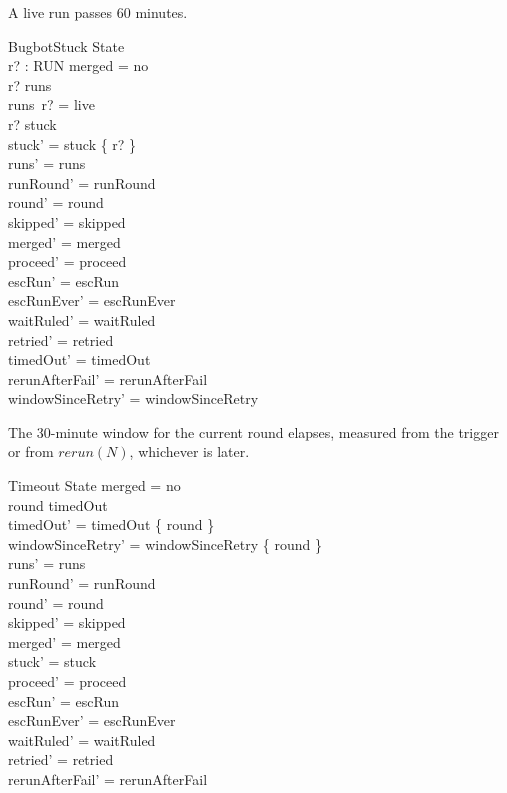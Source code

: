 \documentclass{article}
\begin{document}
A live run passes 60 minutes.

\begin{schema}{BugbotStuck}
  \Delta State \\
  r? : RUN
\where
  merged = no \\
  r? \in \dom runs \\
  runs~r? = live \\
  r? \notin stuck \\
  stuck' = stuck \cup \{ r? \} \\
  runs' = runs \\
  runRound' = runRound \\
  round' = round \\
  skipped' = skipped \\
  merged' = merged \\
  proceed' = proceed \\
  escRun' = escRun \\
  escRunEver' = escRunEver \\
  waitRuled' = waitRuled \\
  retried' = retried \\
  timedOut' = timedOut \\
  rerunAfterFail' = rerunAfterFail \\
  windowSinceRetry' = windowSinceRetry
\end{schema}

The 30-minute window for the current round elapses, measured from the trigger
or from $rerun(N)$, whichever is later.

\begin{schema}{Timeout}
  \Delta State
\where
  merged = no \\
  round \notin timedOut \\
  timedOut' = timedOut \cup \{ round \} \\
  windowSinceRetry' = windowSinceRetry \cup \{ round \} \\
  runs' = runs \\
  runRound' = runRound \\
  round' = round \\
  skipped' = skipped \\
  merged' = merged \\
  stuck' = stuck \\
  proceed' = proceed \\
  escRun' = escRun \\
  escRunEver' = escRunEver \\
  waitRuled' = waitRuled \\
  retried' = retried \\
  rerunAfterFail' = rerunAfterFail
\end{schema}
\end{document}
